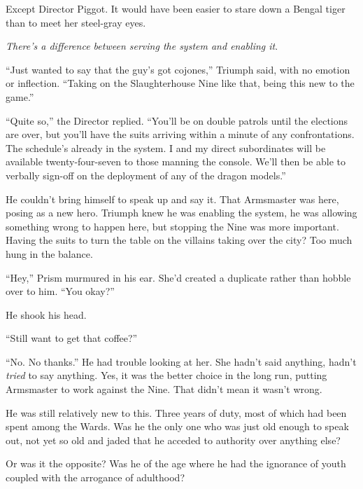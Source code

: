 Except Director Piggot.  It would have been easier to stare down a Bengal tiger than to meet her steel-gray eyes.



\emph{There's a difference between serving the system and enabling it}.



``Just wanted to say that the guy's got cojones,'' Triumph said, with no emotion or inflection.  ``Taking on the Slaughterhouse Nine like that, being this new to the game.''



``Quite so,'' the Director replied.  ``You'll be on double patrols until the elections are over, but you'll have the suits arriving within a minute of any confrontations.  The schedule's already in the system.  I and my direct subordinates will be available twenty-four-seven to those manning the console.  We'll then be able to verbally sign-off on the deployment of any of the dragon models.''



He couldn't bring himself to speak up and say it.  That Armsmaster was here, posing as a new hero.  Triumph knew he was enabling the system, he was allowing something wrong to happen here, but stopping the Nine was more important.  Having the suits to turn the table on the villains taking over the city?  Too much hung in the balance.



``Hey,'' Prism murmured in his ear.  She'd created a duplicate rather than hobble over to him. ``You okay?''



He shook his head.



``Still want to get that coffee?''



``No.  No thanks.''  He had trouble looking at her.  She hadn't said anything, hadn't \emph{tried} to say anything.  Yes, it was the better choice in the long run, putting Armsmaster to work against the Nine.  That didn't mean it wasn't wrong.



He was still relatively new to this.  Three years of duty, most of which had been spent among the Wards.  Was he the only one who was just old enough to speak out, not yet so old and jaded that he acceded to authority over anything else?



Or was it the opposite?  Was he of the age where he had the ignorance of youth coupled with the arrogance of adulthood?



